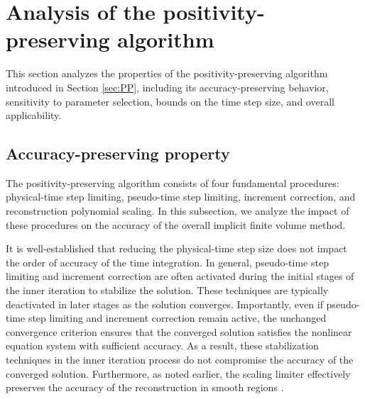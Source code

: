 \begingroup
\color{r2color}

\section{Analysis of the positivity-preserving algorithm}
\label{sec:analysis-of-pp}

This section analyzes the properties of the positivity-preserving algorithm introduced in Section \ref{sec:PP}, including its accuracy-preserving behavior, sensitivity to parameter selection, bounds on the time step size, and overall applicability.

\subsection{Accuracy-preserving property}

The positivity-preserving algorithm consists of four fundamental procedures: physical-time step limiting, pseudo-time step limiting, increment correction, and reconstruction polynomial scaling. In this subsection, we analyze the impact of these procedures on the accuracy of the overall implicit finite volume method.

It is well-established that reducing the physical-time step size does not impact the order of accuracy of the time integration.
In general, pseudo-time step limiting and increment correction are often activated during the initial stages of the inner iteration to stabilize the solution. These techniques are typically deactivated in later stages as the solution converges. Importantly, even if pseudo-time step limiting and increment correction remain active, the unchanged convergence criterion ensures that the converged solution satisfies the nonlinear equation system with sufficient accuracy. As a result, these stabilization techniques in the inner iteration process do not compromise the accuracy of the converged solution.
Furthermore, as noted earlier, the scaling limiter effectively preserves the 
accuracy of the reconstruction in smooth regions \cite{zhang2010positivity}.

